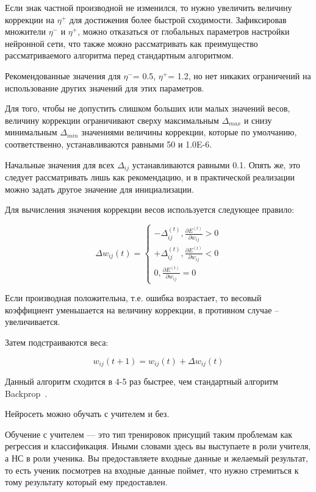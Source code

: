 Если знак частной производной не изменился, то нужно увеличить величину коррекции на $\eta^+$ для достижения более
быстрой сходимости. Зафиксировав множители $\eta^-$ и $\eta^+$, можно отказаться от глобальных параметров настройки
нейронной сети, что также можно рассматривать как преимущество рассматриваемого алгоритма перед стандартным алгоритмом.

Рекомендованные значения для $\eta^-$= 0.5, $\eta^+$= 1.2, но нет никаких ограничений на использование других значений
для этих параметров.

Для того, чтобы не допустить слишком больших или малых значений весов, величину коррекции ограничивают сверху
максимальным ${\Delta}_{max}$ и снизу минимальным ${\Delta}_{min}$ значениями величины коррекции, которые по умолчанию,
соответственно, устанавливаются равными 50 и 1.0E-6.

Начальные значения для всех ${\Delta}_{ij}$ устанавливаются равными 0.1. Опять же, это следует рассматривать лишь как
рекомендацию, и в практической реализации можно задать другое значение для инициализации.

Для вычисления значения коррекции весов используется следующее правило:

\begin{equation}
  {\Delta} w_{ij}(t) =
  \begin{cases}
    - {\Delta}_{ij}^{(t)}, \frac{\partial {E}^{(t)}}{\partial {w}_{ij}} > 0 \\
    + {\Delta}_{ij}^{(t)}, \frac{\partial {E}^{(t)}}{\partial {w}_{ij}} < 0 \\
    0, \frac{\partial {E}^{(t)}}{\partial {w}_{ij}} = 0
  \end{cases}
\end{equation}

Если производная положительна, т.е. ошибка возрастает, то весовый коэффициент уменьшается на величину коррекции,
в противном случае – увеличивается.

Затем подстраиваются веса:

\begin{equation}
  w_{ij}(t+1) = w_{ij}(t) + {\Delta} w_{ij}(t)
\end{equation}

Данный алгоритм сходится в 4-5 раз быстрее, чем стандартный алгоритм Backprop~\cite{RProp}.

Нейросеть можно обучать с учителем и без.

Обучение с учителем — это тип тренировок присущий таким проблемам как регрессия и классификация. Иными словами здесь
вы выступаете в роли учителя, а НС в роли ученика. Вы предоставляете входные данные и желаемый результат, то есть
ученик посмотрев на входные данные поймет, что нужно стремиться к тому результату который ему предоставлен.

